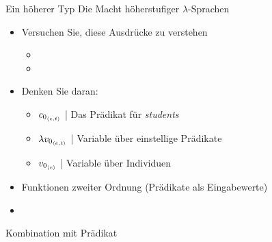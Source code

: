 \begin{frame}
  {Ein höherer Typ}
  \onslide<+->
  \onslide<+->
  Die Macht höherstufiger $\lambda$-Sprachen\\
  \Zeile 
  \begin{itemize}[<+->]
    \item Versuchen Sie, diese Ausdrücke zu verstehen
      \begin{itemize}[<+->]
        \item {}
        \item {}
      \end{itemize}
    \item Denken Sie daran:
      \begin{itemize}[<+->]
        \item $c_{0_{{\langle{}e,t\rangle}}}$ | Das Prädikat für \textit{students}
        \item $\lambda{}v_{0_{{\langle{}e,t\rangle}}}$ | Variable über einstellige Prädikate
        \item $v_{0_{{\langle{}e\rangle}}}$ | Variable über Individuen
      \end{itemize}
      \Halbzeile
    \item \alert{Funktionen zweiter Ordnung} (Prädikate als Eingabewerte) 
      \Halbzeile
      \onslide<+->
    \item {}
  \end{itemize}
\end{frame}

\begin{frame}
  {Kombination mit Prädikat}
  \onslide<+->
  \onslide<+->
  \centering 
\end{frame}


